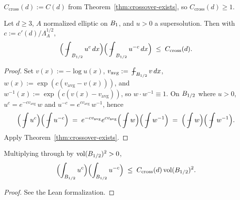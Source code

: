 \begin{definition}
\label{def:Ccrossover}
\leanok
{}
$C_{\mathrm{cross}}(d) := C(d)$ from Theorem~\ref{thm:crossover-exists}, so
$C_{\mathrm{cross}}(d) \geq 1$.
\end{definition}

\begin{theorem}
\label{thm:crossover-estimate}
\leanok
{}
Let $d \geq 3$, $A$ normalized elliptic on $B_{1}$, and $u > 0$ a
supersolution. Then with $c := c'(d)/\Lambda_A^{1/2}$,
\begin{equation*}
  \Bigl(\fint_{\Bz{1/2}} u^c\,dx\Bigr)\Bigl(\fint_{\Bz{1/2}} u^{-c}\,dx\Bigr)
    \;\leq\; C_{\mathrm{cross}}(d).
\end{equation*}
\end{theorem}

\begin{proof}
\leanok
{}

Set $v(x) := -\log u(x)$, $v_{\mathrm{avg}} := \fint_{\Bz{1/2}} v\,dx$,
$w(x) := \exp(c(v_{\mathrm{avg}} - v(x)))$, and
$w^{-1}(x) := \exp(c(v(x) - v_{\mathrm{avg}}))$, so $w \cdot w^{-1} \equiv 1$.
On $B_{1/2}$ where $u > 0$, $u^c = e^{-c v_{\mathrm{avg}}}\,w$ and
$u^{-c} = e^{c v_{\mathrm{avg}}}\,w^{-1}$, hence
\begin{equation*}
  \Bigl(\fint u^c\Bigr)\Bigl(\fint u^{-c}\Bigr)
    \;=\; e^{-cv_{\mathrm{avg}}}e^{cv_{\mathrm{avg}}}
        \Bigl(\fint w\Bigr)\Bigl(\fint w^{-1}\Bigr)
    \;=\; \Bigl(\fint w\Bigr)\Bigl(\fint w^{-1}\Bigr).
\end{equation*}
Apply Theorem~\ref{thm:crossover-exists}.
\end{proof}

\begin{corollary}
\label{cor:crossover-unaveraged}
\leanok
{}
Multiplying through by $\mathrm{vol}(B_{1/2})^2 > 0$,
\begin{equation*}
  \Bigl(\int_{B_{1/2}} u^c\Bigr)\Bigl(\int_{B_{1/2}} u^{-c}\Bigr)
    \;\leq\; C_{\mathrm{cross}}(d)\,\mathrm{vol}(B_{1/2})^2.
\end{equation*}
\end{corollary}

\begin{proof}
\leanok
{}
See the Lean formalization.
\end{proof}

